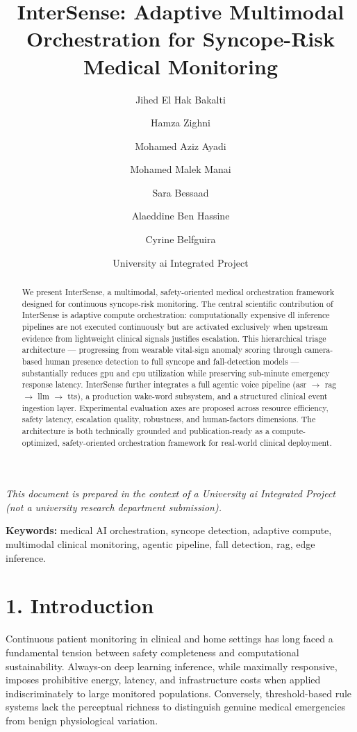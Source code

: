 \documentclass[11pt,a4paper]{article}
\title{\textbf{InterSense: Adaptive Multimodal Orchestration for Syncope-Risk Medical Monitoring}}
\author{
Jihed El Hak Bakalti \and
Hamza Zighni \and
Mohamed Aziz Ayadi \and
Mohamed Malek Manai \and
Sara Bessaad \and
Alaeddine Ben Hassine \and
Cyrine Belfguira
}
\date{University \gls{ai} Integrated Project}
\begin{document}
\maketitle
\onehalfspacing

\begin{center}
\textit{This document is prepared in the context of a University \gls{ai} Integrated Project (not a university research department submission).}
\end{center}

\begin{abstract}
We present InterSense, a \gls{multimodal}, safety-oriented medical orchestration framework designed for continuous \gls{syncope}-risk monitoring. The central scientific contribution of InterSense is adaptive compute \gls{orchestration}: computationally expensive \gls{dl} inference pipelines are not executed continuously but are activated exclusively when upstream evidence from lightweight clinical signals justifies \gls{escalation}. This hierarchical triage architecture — progressing from wearable vital-sign anomaly scoring through camera-based human presence detection to full syncope and fall-detection models — substantially reduces \gls{gpu} and \gls{cpu} utilization while preserving sub-minute emergency response latency. InterSense further integrates a full agentic voice pipeline (\gls{asr} $\rightarrow$ \gls{rag} $\rightarrow$ \gls{llm} $\rightarrow$ \gls{tts}), a production wake-word subsystem, and a structured clinical event ingestion layer. Experimental evaluation axes are proposed across resource efficiency, safety latency, escalation quality, robustness, and human-factors dimensions. The architecture is both technically grounded and publication-ready as a compute-optimized, safety-oriented orchestration framework for real-world clinical deployment.
\end{abstract}

\noindent\textbf{Keywords:} medical AI orchestration, \gls{syncope} detection, adaptive compute, multimodal clinical monitoring, agentic pipeline, fall detection, \gls{rag}, edge inference.

\section{1. Introduction}
Continuous patient monitoring in clinical and home settings has long faced a fundamental tension between safety completeness and computational sustainability. Always-on deep learning inference, while maximally responsive, imposes prohibitive energy, latency, and infrastructure costs when applied indiscriminately to large monitored populations. Conversely, threshold-based rule systems lack the perceptual richness to distinguish genuine medical emergencies from benign physiological variation.
\end{document}
